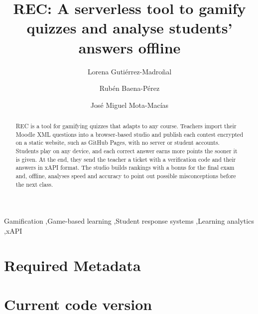 \documentclass[preprint,12pt, a4paper]{elsarticle}
\begin{document}
\begin{frontmatter}

\title{REC: A serverless tool to gamify quizzes and analyse students' answers offline}

\author[uca]{Lorena Gutiérrez-Madroñal}
\author[uca]{Rubén Baena-Pérez}
\author[uca]{José Miguel Mota-Macías}

\address[uca]{Department of Computer Science and Engineering, School of Engineering, University of Cádiz, Avda.\ de la Universidad de Cádiz 10, 11519 Puerto Real, Cádiz, Spain}

\begin{abstract}
REC is a tool for gamifying quizzes that adapts to any course. Teachers import their Moodle XML questions into a browser-based studio and publish each contest encrypted on a static website, such as GitHub Pages, with no server or student accounts. Students play on any device, and each correct answer earns more points the sooner it is given. At the end, they send the teacher a ticket with a verification code and their answers in xAPI format. The studio builds rankings with a bonus for the final exam and, offline, analyses speed and accuracy to point out possible misconceptions before the next class.
\end{abstract}

\begin{keyword}
Gamification \sep Game-based learning \sep Student response systems \sep Learning analytics \sep xAPI
\end{keyword}

\end{frontmatter}

\section*{Required Metadata}
\label{sec:metadata}

\section*{Current code version}
\label{sec:codeversion}
\end{document}
